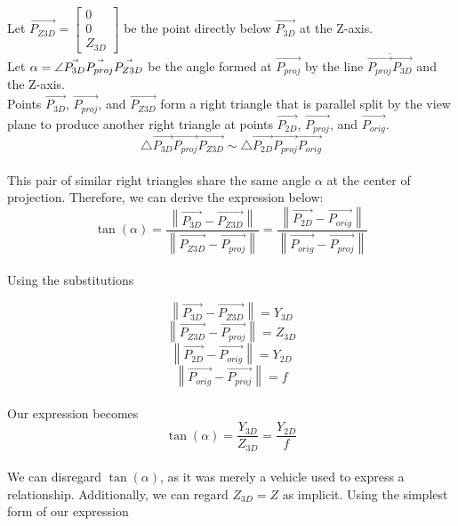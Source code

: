\documentclass[11.pt]{article}
\begin{document}
Let $\vec{P_{Z3D}} = \begin{bmatrix}0\\0\\Z_{3D}\end{bmatrix}$ be the point directly
below $\vec{P_{3D}}$ at the Z-axis.\\[5pt]

Let $\alpha = \mathlarger{\angle}\vec{P_{3D}}\vec{P_{proj}}\vec{P_{Z3D}}$ be the angle
formed at $\vec{P_{proj}}$ by the line $\overline{\vec{P_{proj}}\vec{P_{3D}}}$ and the
Z-axis.\\

Points $\vec{P_{3D}}$, $\vec{P_{proj}}$, and $\vec{P_{Z3D}}$ form a right triangle
that is parallel split by the view plane to produce another right triangle at points
$\vec{P_{2D}}$, $\vec{P_{proj}}$, and $\vec{P_{orig}}$.\\

$$ \triangle\vec{P_{3D}}\vec{P_{proj}}\vec{P_{Z3D}} \sim
   \triangle\vec{P_{2D}}\vec{P_{proj}}\vec{P_{orig}} $$\\

This pair of similar right triangles share the same angle $\alpha$ at the
center of projection. Therefore, we can derive the expression below:\\

$$ \tan(\alpha) = \frac{\left\lVert\vec{P_{3D}} - \vec{ P_{Z3D}}\right\rVert}
                       {\left\lVert\vec{P_{Z3D}}- \vec{P_{proj}}\right\rVert} = 
		  \frac{\left\lVert\vec{P_{2D}} - \vec{P_{orig}}\right\rVert}
		       {\left\lVert\vec{P_{orig}}-\vec{P_{proj}}\right\rVert}$$\\

Using the substitutions

$$\left\lVert\vec{P_{3D}} - \vec{ P_{Z3D}}\right\rVert = Y_{3D}$$
$$\left\lVert\vec{P_{Z3D}}- \vec{P_{proj}}\right\rVert = Z_{3D}$$
$$\left\lVert\vec{P_{2D}} - \vec{P_{orig}}\right\rVert = Y_{2D}$$
$$\left\lVert\vec{P_{orig}}-\vec{P_{proj}}\right\rVert = f$$\\

Our expression becomes\\

$$ \tan(\alpha) = \frac{Y_{3D}}{Z_{3D}} = \frac{Y_{2D}}{f}$$\\

We can disregard $\tan(\alpha)$, as it was merely a vehicle used to express a
relationship. Additionally, we can regard $Z_{3D} = Z$ as implicit. Using the simplest
form of our expression\\
\end{document}

